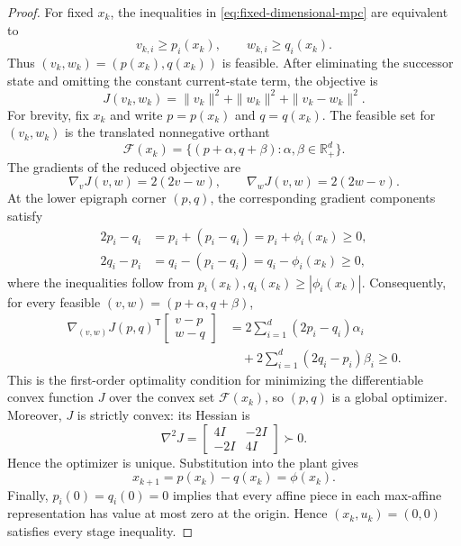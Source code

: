 \documentclass[10pt,a4paper]{amsart}
\newcommand{\R}{\mathbb{R}}
\begin{document}
\begin{proof}
For fixed $x_k$, the inequalities in \eqref{eq:fixed-dimensional-mpc} are
equivalent to
\[
  v_{k,i}\ge p_i(x_k),\qquad w_{k,i}\ge q_i(x_k).
\]
Thus $(v_k,w_k)=(p(x_k),q(x_k))$ is feasible.  After eliminating the successor
state and omitting the constant current-state term, the objective is
\begin{equation*}
  J(v_k,w_k)=\|v_k\|^2+\|w_k\|^2+\|v_k-w_k\|^2.
\end{equation*}
For brevity, fix $x_k$ and write $p=p(x_k)$ and $q=q(x_k)$.  The feasible set
for $(v_k,w_k)$ is the translated nonnegative orthant
\[
  \mathcal F(x_k)=\{(p+\alpha,q+\beta):\alpha,\beta\in\R_+^d\}.
\]
The gradients of the reduced objective are
\[
  \nabla_v J(v,w)=2(2v-w),
  \qquad
  \nabla_w J(v,w)=2(2w-v).
\]
At the lower epigraph corner $(p,q)$, the corresponding gradient components
satisfy
\begin{align*}
  2p_i-q_i&=p_i+(p_i-q_i)=p_i+\phi_i(x_k)\ge0,\\
  2q_i-p_i&=q_i-(p_i-q_i)=q_i-\phi_i(x_k)\ge0,
\end{align*}
where the inequalities follow from
$p_i(x_k),q_i(x_k)\ge |\phi_i(x_k)|$.  Consequently, for every feasible
$(v,w)=(p+\alpha,q+\beta)$,
\begin{align*}
  \nabla_{(v,w)} J(p,q)^{\mathsf T}
  \begin{bmatrix}v-p\\w-q\end{bmatrix}
  &=2\sum_{i=1}^d(2p_i-q_i)\alpha_i\\
  &\quad+2\sum_{i=1}^d(2q_i-p_i)\beta_i
    \ge0.
\end{align*}
This is the first-order optimality condition for minimizing the differentiable
convex function $J$ over the convex set $\mathcal F(x_k)$, so $(p,q)$ is a
global optimizer.  Moreover, $J$ is strictly convex: its Hessian is
\[
  \nabla^2J=
  \begin{bmatrix}4I&-2I\\-2I&4I\end{bmatrix}\succ0.
\]
Hence the optimizer is unique.  Substitution into the plant gives
\[
  x_{k+1}=p(x_k)-q(x_k)=\phi(x_k).
\]
Finally, $p_i(0)=q_i(0)=0$ implies that every affine piece in each max-affine
representation has value at most zero at the origin.  Hence $(x_k,u_k)=(0,0)$
satisfies every stage inequality.
\end{proof}
\end{document}
